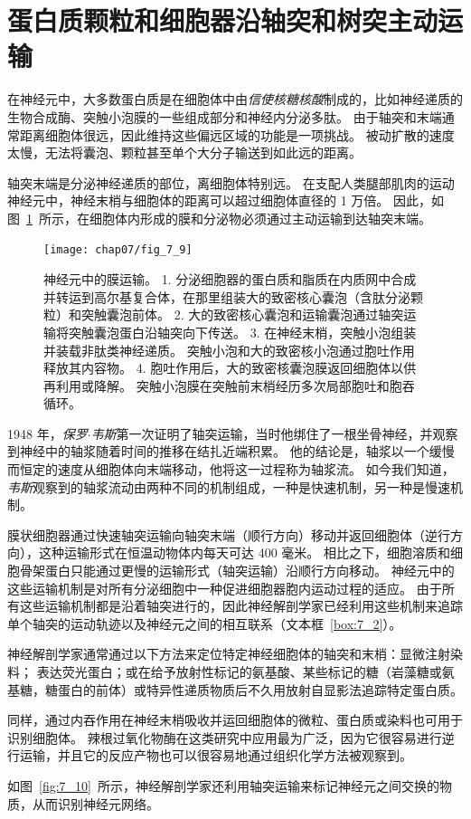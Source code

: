 \section{蛋白质颗粒和细胞器沿轴突和树突主动运输}

在神经元中，大多数蛋白质是在细胞体中由\textit{信使核糖核酸}制成的，比如神经递质的生物合成酶、突触小泡膜的一些组成部分和神经内分泌多肽。
由于轴突和末端通常距离细胞体很远，因此维持这些偏远区域的功能是一项挑战。
被动扩散的速度太慢，无法将囊泡、颗粒甚至单个大分子输送到如此远的距离。


轴突末端是分泌神经递质的部位，离细胞体特别远。
在支配人类腿部肌肉的运动神经元中，神经末梢与细胞体的距离可以超过细胞体直径的 1 万倍。
因此，如图~\ref{fig:7_9}~所示，在细胞体内形成的膜和分泌物必须通过主动运输到达轴突末端。


\begin{figure}[htbp]
	\centering
	\texttt{[image: chap07/fig\_7\_9]}
	\caption{神经元中的膜运输。
		1. 分泌细胞器的蛋白质和脂质在内质网中合成并转运到高尔基复合体，在那里组装大的致密核心囊泡（含肽分泌颗粒）和突触囊泡前体。
		2. 大的致密核心囊泡和运输囊泡通过轴突运输将突触囊泡蛋白沿轴突向下传送。
		3. 在神经末梢，突触小泡组装并装载非肽类神经递质。
		突触小泡和大的致密核小泡通过胞吐作用释放其内容物。
		4. 胞吐作用后，大的致密核囊泡膜返回细胞体以供再利用或降解。
		突触小泡膜在突触前末梢经历多次局部胞吐和胞吞循环。}
	\label{fig:7_9}
\end{figure}


1948 年，\textit{保罗$\cdot$韦斯}第一次证明了轴突运输，当时他绑住了一根坐骨神经，并观察到神经中的轴浆随着时间的推移在结扎近端积累。
他的结论是，轴浆以一个缓慢而恒定的速度从细胞体向末端移动，他将这一过程称为轴浆流。
如今我们知道，\textit{韦斯}观察到的轴浆流动由两种不同的机制组成，一种是快速机制，另一种是慢速机制。


膜状细胞器通过快速轴突运输向轴突末端（顺行方向）移动并返回细胞体（逆行方向），这种运输形式在恒温动物体内每天可达 400 毫米。
相比之下，细胞溶质和细胞骨架蛋白只能通过更慢的运输形式（轴突运输）沿顺行方向移动。
神经元中的这些运输机制是对所有分泌细胞中一种促进细胞器胞内运动过程的适应。
由于所有这些运输机制都是沿着轴突进行的，因此神经解剖学家已经利用这些机制来追踪单个轴突的运动轨迹以及神经元之间的相互联系（文本框~\ref{box:7_2}）。

\begin{proposition}[神经解剖学追踪利用轴突运输] \label{box:7_2}
	
	\quad \quad 神经解剖学家通常通过以下方法来定位特定神经细胞体的轴突和末梢：显微注射染料；
	表达荧光蛋白；或在给予放射性标记的氨基酸、某些标记的糖（岩藻糖或氨基糖，糖蛋白的前体）或特异性递质物质后不久用放射自显影法追踪特定蛋白质。
	
	\quad \quad 同样，通过内吞作用在神经末梢吸收并运回细胞体的微粒、蛋白质或染料也可用于识别细胞体。
	辣根过氧化物酶在这类研究中应用最为广泛，因为它很容易进行逆行运输，并且它的反应产物也可以很容易地通过组织化学方法被观察到。
	
	\quad \quad 如图~\ref{fig:7_10}~所示，神经解剖学家还利用轴突运输来标记神经元之间交换的物质，从而识别神经元网络。
	
\end{proposition}


